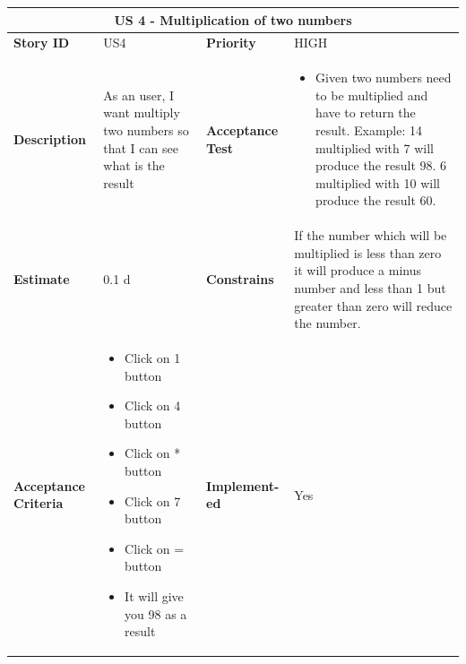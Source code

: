 \documentclass{article}
\begin{document}
\begin{tabular}{ |p{2cm}|p{5cm}|p{2cm}|p{4cm}| }
 \hline
 \multicolumn{4}{|c|}{US 4 - Multiplication of two numbers} \\
 \hline
 \textbf {Story ID}& US4 &  \textbf{Priority} & HIGH \\
 \hline
  \textbf{Description}   & As an user, I want multiply two numbers so that I can see what is the result &    \textbf{Acceptance Test}& 
\begin{itemize}
\item Given two numbers need to be multiplied and have to return the result. Example: 14 multiplied with 7 will produce the result 98. 6 multiplied with 10 will produce the result 60. 
\end{itemize}
  \\
 \hline
 \textbf{Estimate} & 0.1 d &  \textbf{Constrains}&  If the number which will be multiplied is less than zero it will produce a minus number and  less than 1 but greater than zero will reduce the number. \\
 \hline
 \textbf{Acceptance Criteria} & 
 \begin{itemize}
\item Click on 1 button
\item Click on 4 button
\item Click on * button
\item Click on 7 button
\item Click on = button
\item It will give you 98 as a result 
\end{itemize}
 &  \textbf{Implement- ed}& Yes  \\
 \hline
\end{tabular}
\end{document}
